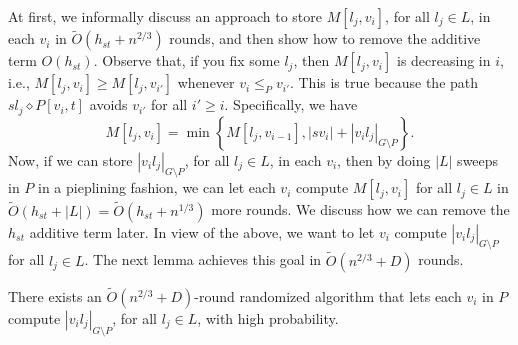 At first, we informally discuss an approach to store $M[l_j,v_i]$, for all $l_j \in L$, in each $v_i$ in $\widetilde{O}(h_{st}+n^{2/3})$ rounds, and then show how to remove the additive term $O(h_{st})$.
Observe that, if you fix some $l_j$, then $M[l_j,v_i]$ is decreasing in $i$, i.e., $M[l_j,v_i] \geq M[l_j,v_{i'}]$ whenever $v_i \leq_{P}v_{i'}$. This is true because the path $sl_j \diamond P[v_{i},t]$  avoids $v_{i'}$ for all $i' \geq i$. %
Specifically, we have  \[M[l_j,v_i]= \min \left\{ M[l_j,v_{i-1}], |sv_i|+|v_il_j|_{G \setminus P} \right\}.\] Now, if we can store   $|v_il_j|_{G \setminus P}$, for all $l_j \in L$, in each $v_i$, then by doing $|L|$ sweeps in $P$ in a pieplining fashion, we can let each $v_i$ compute $M[l_j, v_i]$ for all $l_j \in L$ in $\widetilde{O}(h_{st}+|L|) = \widetilde{O}(h_{st}+n^{1/3})$ more rounds. We discuss how we can remove the $h_{st}$ additive term later. In view of the above, we want to let $v_i$ compute $|v_il_j|_{G \setminus P}$ for all $l_j \in L$. The next lemma achieves this goal in $\widetilde{O}(n^{2/3} + D)$ rounds.






\begin{lemma} \label{lemma: vilj path}
    There exists an $\widetilde{O}(n^{2/3}+D)$-round randomized algorithm that lets each $v_i$ in $P$ compute $|v_il_j|_{G \setminus P}$, for all $l_j \in L$, with high probability.
\end{lemma}

